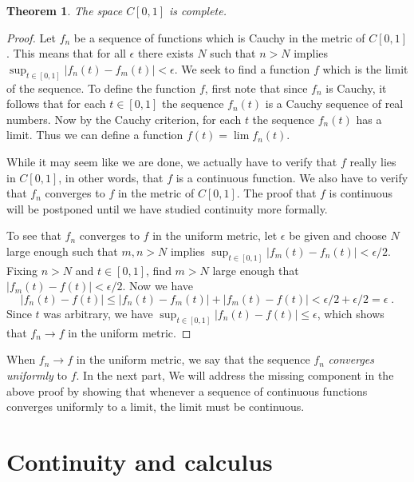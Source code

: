\documentclass[11pt,oneside]{amsbook}
\theoremstyle{definition}
\theoremstyle{plain}
\newtheorem{thm}{Theorem}[section]
\theoremstyle{definition}
\theoremstyle{remark}
\numberwithin{equation}{section}
\numberwithin{figure}{section}
\begin{document}
\begin{thm}
  The space $C[0,1]$ is complete.
\end{thm}

\begin{proof}
  Let $f_n$ be a sequence of functions which is Cauchy in the metric of $C[0,1]$. This means that for all $\epsilon$ there exists $N$ such that $n>N$ implies $\sup_{t\in[0,1]}|f_n(t)-f_m(t)|<\epsilon$. We seek to find a function $f$ which is the limit of the sequence. To define the function $f$, first note that since $f_n$ is Cauchy, it follows that for each $t\in[0,1]$ the sequence $f_n(t)$ is a Cauchy sequence of real numbers. Now by the Cauchy criterion, for each $t$ the sequence $f_n(t)$ has a limit. Thus we can define a function $f(t)=\lim f_n(t)$.

  While it may seem like we are done, we actually have to verify that $f$ really lies in $C[0,1]$, in other words, that $f$ is a continuous function. We also have to verify that $f_n$ converges to $f$ in the metric of $C[0,1]$. The proof that $f$ is continuous will be postponed until we have studied continuity more formally.

  To see that $f_n$ converges to $f$ in the uniform metric, let $\epsilon$ be given and choose $N$ large enough such that $m,n>N$ implies $\sup_{t\in[0,1]}|f_m(t)-f_n(t)|<\epsilon/2$. Fixing $n>N$ and $t\in[0,1]$, find $m>N$ large enough that $|f_m(t)-f(t)|<\epsilon/2$. Now we have
\[|f_n(t)-f(t)|\leq|f_n(t)-f_m(t)|+|f_m(t)-f(t)|<\epsilon/2+\epsilon/2=\epsilon\;.
\]
Since $t$ was arbitrary, we have $\sup_{t\in[0,1]}|f_n(t)-f(t)|\leq\epsilon$, which shows that $f_n\to f$ in the uniform metric.
\end{proof}

When $f_n\to f$ in the uniform metric, we say that the sequence $f_n$ \emph{converges uniformly} to $f$. In the next part, We will address the missing component in the above proof by showing that whenever a sequence of continuous functions converges uniformly to a limit, the limit must be continuous.


\chapter{Continuity and calculus}

\end{document}
